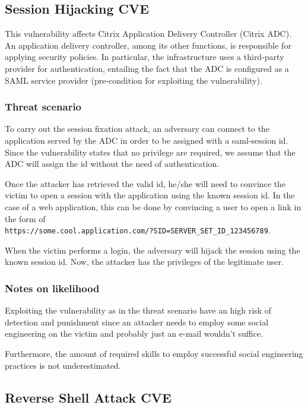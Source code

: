 \subsection*{Session Hijacking \- CVE}

This vulnerability affects Citrix Application Delivery Controller (Citrix ADC). An application delivery controller, among its other functions, is responsible for applying security policies. In particular, the infrastructure uses a third-party provider for authentication, entailing the fact that the ADC is configured as a SAML service provider (pre-condition for exploiting the vulnerability).

\subsubsection*{Threat scenario}

To carry out the session fixation attack, an adversary can connect to the application served by the ADC in order to be assigned with a saml-session id. Since the vulnerability states that no privilege are required, we assume that the ADC will assign the id without the need of authentication.

Once the attacker has retrieved the valid id, he/she will need to convince the victim to open a session with the application using the known session id. In the case of a web application, this can be done by convincing a user to open a link in the form of \\ \texttt{https://some.cool.application.com/?SID=SERVER\_SET\_ID\_123456789}.

When the victim performs a login, the adversary will hijack the session using the known session id.\cite{article:kolsek2002session} Now, the attacker has the privileges of the legitimate user.

\subsubsection*{Notes on likelihood}

Exploiting the vulnerability as in the threat scenario have an high risk of detection and punishment since an attacker needs to employ some social engineering on the victim and probably just an e-mail wouldn't suffice.

Furthermore, the amount of required skills to employ successful social engineering practices is not underestimated.

\subsection*{Reverse Shell Attack \- CVE}

